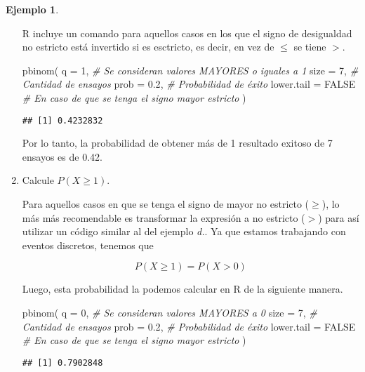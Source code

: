 \documentclass[
]{book}
\newenvironment{Shaded}{\begin{snugshade}}{\end{snugshade}}
\newcommand{\AttributeTok}[1]{\textcolor[rgb]{0.77,0.63,0.00}{#1}}
\newcommand{\CommentTok}[1]{\textcolor[rgb]{0.56,0.35,0.01}{\textit{#1}}}
\newcommand{\ConstantTok}[1]{\textcolor[rgb]{0.00,0.00,0.00}{#1}}
\newcommand{\DecValTok}[1]{\textcolor[rgb]{0.00,0.00,0.81}{#1}}
\newcommand{\FloatTok}[1]{\textcolor[rgb]{0.00,0.00,0.81}{#1}}
\newcommand{\FunctionTok}[1]{\textcolor[rgb]{0.00,0.00,0.00}{#1}}
\newcommand{\NormalTok}[1]{#1}
\theoremstyle{definition}
\theoremstyle{definition}
\newtheorem{example}{Ejemplo}[chapter]
\theoremstyle{definition}
\theoremstyle{definition}
\theoremstyle{remark}
\begin{document}
\begin{example}
\begin{enumerate}
  R incluye un comando para aquellos casos en los que el signo de desigualdad no estricto está invertido si es esctricto, es decir, en vez de \(\leq\) se tiene \(>\).

\begin{Shaded}
\begin{Highlighting}[]
\FunctionTok{pbinom}\NormalTok{(}
  \AttributeTok{q =} \DecValTok{1}\NormalTok{, }\CommentTok{\# Se consideran valores MAYORES o iguales a 1}
  \AttributeTok{size =} \DecValTok{7}\NormalTok{, }\CommentTok{\# Cantidad de ensayos}
  \AttributeTok{prob =} \FloatTok{0.2}\NormalTok{, }\CommentTok{\# Probabilidad de éxito}
  \AttributeTok{lower.tail =} \ConstantTok{FALSE} \CommentTok{\# En caso de que se tenga el signo mayor estricto}
\NormalTok{)}
\end{Highlighting}
\end{Shaded}

\begin{verbatim}
## [1] 0.4232832
\end{verbatim}

  Por lo tanto, la probabilidad de obtener más de 1 resultado exitoso de 7 ensayos es de 0.42.
\item
  Calcule \(P(X \geq 1)\).

  Para aquellos casos en que se tenga el signo de mayor no estricto (\(\geq\)), lo más más recomendable es transformar la expresión a no estricto (\(>\)) para así utilizar un código similar al del ejemplo \emph{d.}. Ya que estamos trabajando con eventos discretos, tenemos que

  \[P(X \geq 1) =P(X > 0)\]

  Luego, esta probabilidad la podemos calcular en R de la siguiente manera.

\begin{Shaded}
\begin{Highlighting}[]
\FunctionTok{pbinom}\NormalTok{(}
  \AttributeTok{q =} \DecValTok{0}\NormalTok{, }\CommentTok{\# Se consideran valores MAYORES a 0}
  \AttributeTok{size =} \DecValTok{7}\NormalTok{, }\CommentTok{\# Cantidad de ensayos}
  \AttributeTok{prob =} \FloatTok{0.2}\NormalTok{, }\CommentTok{\# Probabilidad de éxito}
  \AttributeTok{lower.tail =} \ConstantTok{FALSE} \CommentTok{\# En caso de que se tenga el signo mayor estricto}
\NormalTok{  )}
\end{Highlighting}
\end{Shaded}

\begin{verbatim}
## [1] 0.7902848
\end{verbatim}


\end{enumerate}
\end{example}
\end{document}
